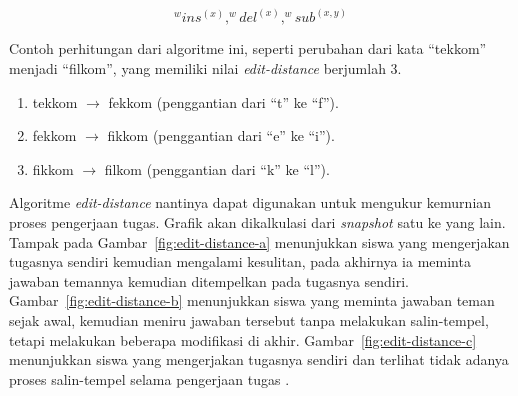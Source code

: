 \begin{equation}
  ^wins^{(x)}, ^wdel^{(x)}, ^wsub^{(x, y)}
\end{equation}

Contoh perhitungan dari algoritme ini, seperti perubahan dari kata ``tekkom''
menjadi ``filkom'', yang memiliki nilai \emph{edit-distance} berjumlah 3.

\begin{enumerate}
\item tekkom $\rightarrow$ fekkom (penggantian dari ``t'' ke ``f'').
\item fekkom $\rightarrow$ fikkom (penggantian dari ``e'' ke ``i'').
\item fikkom $\rightarrow$ filkom (penggantian dari ``k'' ke ``l'').
\end{enumerate}

Algoritme \emph{edit-distance} nantinya dapat digunakan untuk mengukur kemurnian proses
pengerjaan tugas. Grafik akan dikalkulasi dari \emph{snapshot} satu ke
yang lain. Tampak pada Gambar~\ref{fig:edit-distance-a} menunjukkan siswa
yang mengerjakan tugasnya sendiri kemudian mengalami kesulitan, pada akhirnya
ia meminta jawaban temannya kemudian ditempelkan pada tugasnya
sendiri. Gambar~\ref{fig:edit-distance-b} menunjukkan siswa yang meminta
jawaban teman sejak awal, kemudian meniru jawaban tersebut tanpa
melakukan salin-tempel, tetapi melakukan beberapa modifikasi di
akhir. Gambar~\ref{fig:edit-distance-c} menunjukkan siswa yang mengerjakan
tugasnya sendiri dan terlihat tidak adanya proses salin-tempel selama
pengerjaan tugas \parencite{hellas2017plagiarism}.

